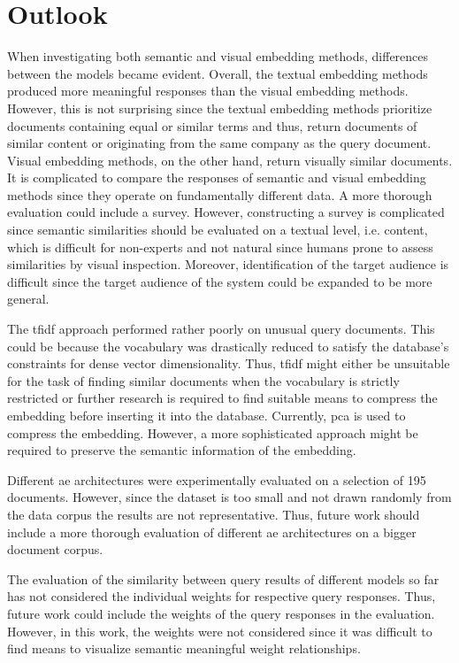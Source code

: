 \section{Outlook}\label{sec:outlook}

When investigating both semantic and visual embedding methods, differences between the models became evident.
Overall, the textual embedding methods produced more meaningful responses than the visual embedding methods.
However, this is not surprising since the textual embedding methods prioritize documents containing equal or similar terms and thus,
return documents of similar content or originating from the same company as the query document.
Visual embedding methods, on the other hand, return visually similar documents.
It is complicated to compare the responses of semantic and visual embedding methods since they operate on fundamentally different data.
A more thorough evaluation could include a survey.
However, constructing a survey is complicated since semantic similarities should be evaluated on a textual level, i.e. content, 
which is difficult for non-experts and not natural since humans prone to assess similarities by visual inspection.
Moreover, identification of the target audience is difficult since the target audience of the system could be expanded to be more general.

The \ac{tfidf} approach performed rather poorly on unusual query documents.
This could be because the vocabulary was drastically reduced to satisfy the database's constraints for dense vector dimensionality.
Thus, \ac{tfidf} might either be unsuitable for the task of finding similar documents when the vocabulary is strictly restricted or 
further research is required to find suitable means to compress the embedding before inserting it into the database.
Currently, \ac{pca} is used to compress the embedding. 
However, a more sophisticated approach might be required to preserve the semantic information of the embedding.

Different \ac{ae} architectures were experimentally evaluated on a selection of 195 documents.
However, since the dataset is too small and not drawn randomly from the data corpus the results are not representative.
Thus, future work should include a more thorough evaluation of different \ac{ae} architectures on a bigger document corpus.

The evaluation of the similarity between query results of different models so far 
has not considered the individual weights for respective query responses.
Thus, future work could include the weights of the query responses in the evaluation.
However, in this work, the weights were not considered since it was difficult to find means 
to visualize semantic meaningful weight relationships.

